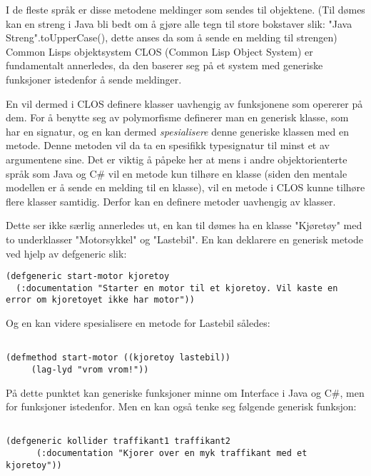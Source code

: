 \documentclass[11pt]{article}
\begin{document}
I de fleste språk er disse metodene meldinger som sendes til objektene. (Til dømes kan en streng i Java bli bedt om å gjøre alle tegn til store bokstaver slik: "Java Streng".toUpperCase(), dette anses da som å sende en melding til strengen) Common Lisps objektsystem CLOS (Common Lisp Object System) er fundamentalt annerledes, da den baserer seg på et system med generiske funksjoner istedenfor å sende meldinger.



En vil dermed i CLOS definere klasser uavhengig av funksjonene som opererer på dem. For å benytte seg av polymorfisme definerer man en generisk klasse, som har en signatur, og en kan dermed \emph{spesialisere} denne generiske klassen med en metode. Denne metoden vil da ta en spesifikk typesignatur til minst et av argumentene sine. Det er viktig å påpeke her at mens i andre objektorienterte språk som Java og C\# vil en metode kun tilhøre en klasse (siden den mentale modellen er å sende en melding til en klasse), vil en metode i CLOS kunne tilhøre flere klasser samtidig. Derfor kan en definere metoder uavhengig av klasser.



Dette ser ikke særlig annerledes ut, en kan til dømes ha en klasse "Kjøretøy" med to underklasser "Motorsykkel" og "Lastebil". En kan deklarere en generisk metode ved hjelp av defgeneric slik:




\begin{lstlisting}
(defgeneric start-motor kjoretoy
  (:documentation "Starter en motor til et kjoretoy. Vil kaste en error om kjoretoyet ikke har motor"))
\end{lstlisting}




Og en kan videre spesialisere en metode for Lastebil således:




\begin{lstlisting}

(defmethod start-motor ((kjoretoy lastebil))
     (lag-lyd "vrom vrom!"))
\end{lstlisting}




På dette punktet kan generiske funksjoner minne om Interface i Java og C\#, men for funksjoner istedenfor. Men en kan også tenke seg følgende generisk funksjon:




\begin{lstlisting}

(defgeneric kollider traffikant1 traffikant2
      (:documentation "Kjorer over en myk traffikant med et kjoretoy"))
\end{lstlisting}
\end{document}
